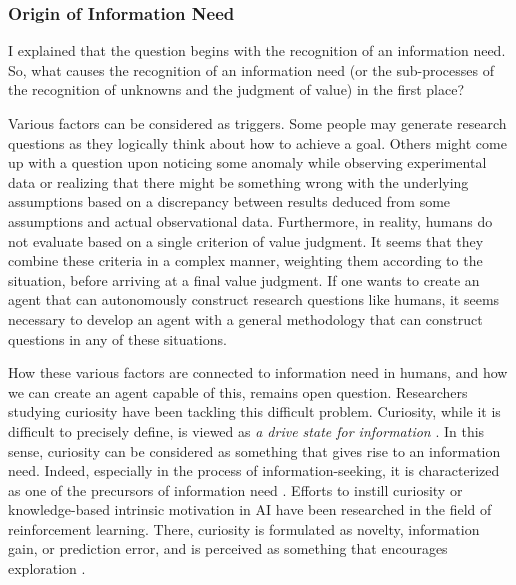 \subsubsection{Origin of Information Need}
I explained that the question begins with the recognition of an information need. So, what causes the recognition of an information need (or the sub-processes of the recognition of unknowns and the judgment of value) in the first place?

Various factors can be considered as triggers. Some people may generate research questions as they logically think about how to achieve a goal. Others might come up with a question upon noticing some anomaly while observing experimental data or realizing that there might be something wrong with the underlying assumptions based on a discrepancy between results deduced from some assumptions and actual observational data. Furthermore, in reality, humans do not evaluate based on a single criterion of value judgment. It seems that they combine these criteria in a complex manner, weighting them according to the situation, before arriving at a final value judgment.
If one wants to create an agent that can autonomously construct research questions like humans, it seems necessary to develop an agent with a general methodology that can construct questions in any of these situations.

How these various factors are connected to information need in humans, and how we can create an agent capable of this, remains open question. Researchers studying curiosity have been tackling this difficult problem. Curiosity, while it is difficult to precisely define, is viewed as \textit{a drive state for information} \cite{kidd2015psychology}. In this sense, curiosity can be considered as something that gives rise to an information need. Indeed, especially in the process of information-seeking, it is characterized as one of the precursors of information need \cite{case2016looking}. Efforts to instill curiosity \cite{schmidhuber1991possibility} or knowledge-based intrinsic motivation \cite{oudeyer2007intrinsic} in AI have been researched in the field of reinforcement learning. There, curiosity is formulated as novelty, information gain, or prediction error, and is perceived as something that encourages exploration \cite{aubret2019survey}.

